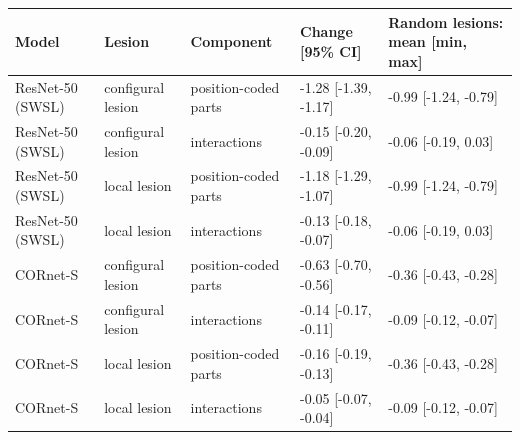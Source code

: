 \begin{tabular}{lllll}
\hline
Model & Lesion & Component & Change [95\% CI] & Random lesions: mean [min, max] \\
\hline
ResNet-50 (SWSL) & configural lesion & position-coded parts & -1.28 [-1.39, -1.17] & -0.99 [-1.24, -0.79] \\
ResNet-50 (SWSL) & configural lesion & interactions & -0.15 [-0.20, -0.09] & -0.06 [-0.19, 0.03] \\
ResNet-50 (SWSL) & local lesion & position-coded parts & -1.18 [-1.29, -1.07] & -0.99 [-1.24, -0.79] \\
ResNet-50 (SWSL) & local lesion & interactions & -0.13 [-0.18, -0.07] & -0.06 [-0.19, 0.03] \\
CORnet-S & configural lesion & position-coded parts & -0.63 [-0.70, -0.56] & -0.36 [-0.43, -0.28] \\
CORnet-S & configural lesion & interactions & -0.14 [-0.17, -0.11] & -0.09 [-0.12, -0.07] \\
CORnet-S & local lesion & position-coded parts & -0.16 [-0.19, -0.13] & -0.36 [-0.43, -0.28] \\
CORnet-S & local lesion & interactions & -0.05 [-0.07, -0.04] & -0.09 [-0.12, -0.07] \\
\hline
\end{tabular}